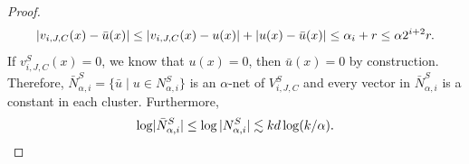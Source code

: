 \documentclass[11pt,letterpaper]{article}
\theoremstyle{definition}
\newcommand{\Yi}[1]{\textcolor{magenta}{YI: #1}}
\DeclareMathOperator{\dist}{dist}
\DeclarePairedDelimiter{\abs}{\lvert}{\rvert}
\begin{document}
\begin{proof}
    \[
        \abs{v_{i,J,C}(x) - \bar{u}(x)} \leq \abs{v_{i,J,C}(x) - u(x)} + \abs{u(x) - \bar{u}(x)} \leq \alpha_i + r \leq \alpha2^{i+2}r.
    \]
    If $v_{i,J,C}^S(x)=0$, we know that $u(x)=0$, then $\bar{u}(x)=0$ by construction.
    Therefore, $\bar{N}_{\alpha,i}^S=\{\bar{u}\mid u\in N_{\alpha,i}^S\}$ is an $\alpha$-net of $V_{i,J,C}^S$ and every vector in  $\bar{N}_{\alpha,i}^S$ is a constant in each cluster. Furthermore,
    \[
        \log \abs{\bar{N}_{\alpha,i}^S} \leq \log |N_{\alpha,i}^S|\lesssim kd\log (k/\alpha). \qedhere
    \]
%    
%    
%
    
\end{proof}
\end{document}

